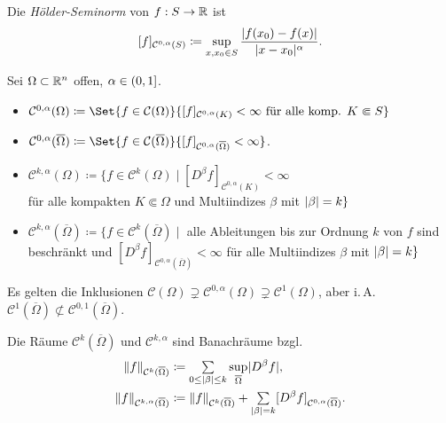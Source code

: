\documentclass{cheat-sheet}
\begin{document}
\begin{defn}
  Die \emph{Hölder-Seminorm} von $f : S \to \mathbb{R}$ ist
  \[ [f]_{\mathcal{C}^{0,\alpha}(S)} \coloneqq \sup_{x,x_0 \in S} \frac{\lvert f(x_0) - f(x)\rvert}{\lvert x-x_0\rvert^\alpha}. \]
\end{defn}

\begin{defn}
  Sei $\Omega \subset \mathbb{R}^n$ offen, $\alpha \in \left( 0, 1 \right]$.
  \begin{itemize}
    \item $\mathcal{C}^{0,\alpha}(\Omega) \coloneqq \Set{ f \in \mathcal{C}(\Omega) }{ [f]_{\mathcal{C}^{0,\alpha}(K)} < \infty \text{ für alle komp. } K \Subset S }$
    \item $\mathcal{C}^{0,\alpha}(\overline{\Omega}) \coloneqq \Set{f \in \mathcal{C}(\overline{\Omega})}{[f]_{\mathcal{C}^{0,\alpha}(\overline{\Omega})} < \infty}$.
    \item $\mathcal{C}^{k,\alpha}(\Omega) \coloneqq \{ f \in \mathcal{C}^k(\Omega) \mid [D^\beta f]_{\mathcal{C}^{0,\alpha}(K)} < \infty$\\für alle kompakten $K \Subset \Omega$ und Multiindizes $\beta$ mit $\lvert\beta\rvert = k \}$
    \item $\mathcal{C}^{k,\alpha}(\overline{\Omega}) \coloneqq \{ f \in \mathcal{C}^k(\overline{\Omega}) \mid$ alle Ableitungen bis zur Ordnung $k$ von $f$ sind beschränkt und $[D^\beta f]_{\mathcal{C}^{0,\alpha}(\overline{\Omega})} < \infty$ für alle Multiindizes $\beta$ mit $\lvert\beta\rvert = k \}$
  \end{itemize}
\end{defn}


\begin{bem}
  Es gelten die Inklusionen $\mathcal{C}(\Omega) \supsetneq \mathcal{C}^{0,\alpha}(\Omega) \supsetneq \mathcal{C}^1(\Omega)$, aber i.\,A. $\mathcal{C}^1(\overline{\Omega}) \not\subset \mathcal{C}^{0,1}(\overline{\Omega})$.
\end{bem}

\begin{bem}
  Die Räume $\mathcal{C}^k(\overline{\Omega})$ und $\mathcal{C}^{k,\alpha}$ sind Banachräume bzgl.
  \begin{align*}
    \norm{f}_{\mathcal{C}^k(\overline{\Omega})} &\coloneqq \sum_{0 \leq \abs{\beta} \leq k} \sup_{\overline{\Omega}} \abs{D^\beta f},\\
    \norm{f}_{\mathcal{C}^{k,\alpha}(\overline{\Omega})} &\coloneqq \norm{f}_{\mathcal{C}^{k}(\overline{\Omega})} + \sum_{\abs{\beta} = k} [D^\beta f]_{\mathcal{C}^{0,\alpha}(\overline{\Omega})}.
  \end{align*}
\end{bem}
\end{document}
